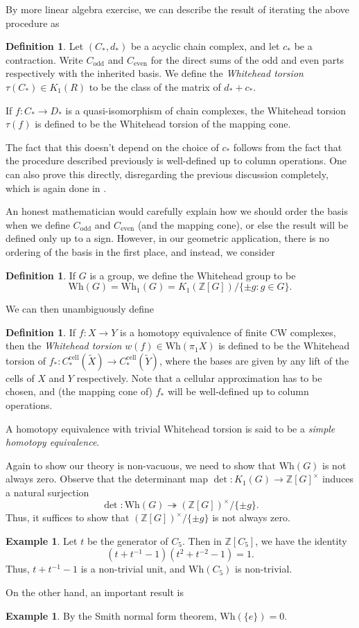 \documentclass[a4paper, 12pt]{article}
\theoremstyle{definition}
\newtheorem{defi}[thm]{Definition}
\newtheorem{eg}[thm]{Example}
\newcommand\Z{\mathbb{Z}}
\newcommand\Wh{\mathrm{Wh}}
\newcommand\cell{\mathrm{cell}}
\begin{document}
By more linear algebra exercise, we can describe the result of iterating the above procedure as
\begin{defi}
  Let $(C_*, d_*)$ be a acyclic chain complex, and let $c_*$ be a contraction. Write $C_{\mathrm{odd}}$ and $C_{\mathrm{even}}$ for the direct sums of the odd and even parts respectively with the inherited basis. We define the \emph{Whitehead torsion} $\tau(C_*) \in K_1(R)$ to be the class of the matrix of $d_* + c_*$.

  If $f: C_* \to D_*$ is a quasi-isomorphism of chain complexes, the Whitehead torsion $\tau(f)$ is defined to be the Whitehead torsion of the mapping cone.
\end{defi}
The fact that this doesn't depend on the choice of $c_*$ follows from the fact that the procedure described previously is well-defined up to column operations. One can also prove this directly, disregarding the previous discussion completely, which is again done in \cite{milnor-whitehead-torsion}.

An honest mathematician would carefully explain how we should order the basis when we define $C_{\mathrm{odd}}$ and $C_{\mathrm{even}}$ (and the mapping cone), or else the result will be defined only up to a sign. However, in our geometric application, there is no ordering of the basis in the first place, and instead, we consider
\begin{defi}
  If $G$ is a group, we define the Whitehead group to be
  \[
    \Wh(G) = \Wh_1(G) = K_1(\Z[G])/\{\pm g: g \in G\}.
  \]
\end{defi}
We can then unambiguously define
\begin{defi}
  If $f: X \to Y$ is a homotopy equivalence of finite CW complexes, then the \emph{Whitehead torsion} $w(f) \in \Wh(\pi_1X)$ is defined to be the Whitehead torsion of $f_*: C^{\cell}_*(\tilde{X}) \to C^{\cell}_*(\tilde{Y})$, where the bases are given by any lift of the cells of $X$ and $Y$ respectively. Note that a cellular approximation has to be chosen, and (the mapping cone of) $f_*$ will be well-defined up to column operations.

  A homotopy equivalence with trivial Whitehead torsion is said to be a \emph{simple homotopy equivalence}.
\end{defi}

Again to show our theory is non-vacuous, we need to show that $\Wh(G)$ is not always zero. Observe that the determinant map $\det: K_1(G) \to \Z[G]^\times$ induces a natural surjection
\[
  \det: \Wh(G) \twoheadrightarrow (\Z[G])^\times/\{\pm g\}.
\]
Thus, it suffices to show that $(\Z[G])^\times/\{\pm g\}$ is not always zero.
\begin{eg}
  Let $t$ be the generator of $C_5$. Then in $\Z[C_5]$, we have the identity
  \[
    (t + t^{-1} - 1)(t^2 + t^{-2} - 1) = 1.
  \]
  Thus, $t + t^{-1} - 1$ is a non-trivial unit, and $\Wh(C_5)$ is non-trivial.
\end{eg}
On the other hand, an important result is
\begin{eg}
  By the Smith normal form theorem, $\Wh(\{e\}) = 0$.
\end{eg}
\end{document}
